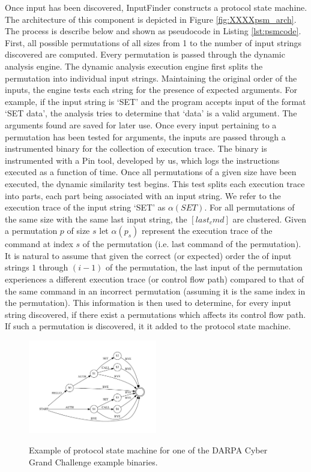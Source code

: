 \documentclass{acm_proc_article-sp}
\def \tool {InputFinder}
\begin{document}
Once input has been discovered, \tool{} constructs a protocol state machine.
The architecture of this component is depicted in Figure \ref{fig:XXXXpsm_arch}.
The process is describe below and shown as pseudocode in Listing \ref{lst:psmcode}.
First, all possible permutations of all sizes from 1 to the number of input strings discovered are computed.
Every permutation is passed through the dynamic analysis engine.
The dynamic analysis execution engine first splits the permutation into individual input strings.
Maintaining the original order of the inputs, the engine tests each string for the presence of expected arguments.
For example, if the input string is `SET' and the program accepts input of the format `SET data', the analysis tries to determine that `data' is a valid argument.
The arguments found are saved for later use.
Once every input pertaining to a permutation has been tested for arguments, the inputs are passed through a instrumented binary for the collection of execution trace.
The binary is instrumented with a Pin tool, developed by us, which logs the instructions executed as a function of time.
Once all permutations of a given size have been executed, the dynamic similarity test begins.
This test splits each execution trace into parts, each part being associated with an input string.
We refer to the execution trace of the input string `SET' as $\alpha(SET)$.
For all permutations of the same size with the same last input string, the $ [last_cmd] $ are clustered.
Given a permutation $p$ of size $s$ let $\alpha(p_s)$ represent the execution trace of the command at index $s$ of the permutation (i.e. last command of the permutation).
It is natural to assume that given the correct (or expected) order the of input strings $1$ through $(i-1)$ of the permutation, the last input of the permutation experiences a different execution trace (or control flow path) compared to that of the same command in an incorrect permutation (assuming it is the same index in the permutation).
This information is then used to determine, for every input string discovered, if there exist a permutations which affects its control flow path.
If such a permutation is discovered, it it added to the protocol state machine.

\begin{figure}[h!]
\caption{Example of protocol state machine for one of the DARPA Cyber Grand Challenge example binaries.}
\centering
\includegraphics[width=0.5\textwidth]{protocoldiagram}
\label{fig:psm_example}
\end{figure}
\end{document}
